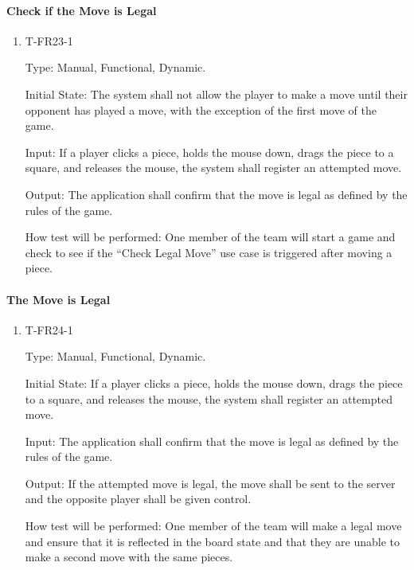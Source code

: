\documentclass[12pt, titlepage]{article}
\begin{document}
    \paragraph{Check if the Move is Legal}

        \begin{enumerate}

        \item{T-FR23-1\\}

            Type: Manual, Functional, Dynamic.
            					
            Initial State: The system shall not allow the player to make a move until their opponent has played a move, with the exception of the first move of the game.
            					
            Input: If a player clicks a piece, holds the mouse down, drags the piece to a square, and releases the mouse, the system shall register an attempted move.
            					
            Output: The application shall confirm that the move is legal as defined by the rules of the game.

            How test will be performed: One member of the team will start a game and check to see if the ``Check Legal Move'' use case is triggered after moving a piece.

        \end{enumerate}

    \paragraph{The Move is Legal}

            \begin{enumerate}

            \item{T-FR24-1\\}

                Type: Manual, Functional, Dynamic.
                					
                Initial State: If a player clicks a piece, holds the mouse down, drags the piece to a square, and releases the mouse, the system shall register an attempted move.
                					
                Input: The application shall confirm that the move is legal as defined by the rules of the game.
                					
                Output: If the attempted move is legal, the move shall be sent to the server and the opposite player shall be given control.

                How test will be performed: One member of the team will make a legal move and ensure that it is reflected in the board state and that they are unable to make a second move with the same pieces.

            \end{enumerate}
\end{document}
